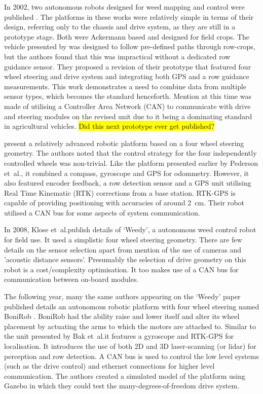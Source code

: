 \documentclass[preprint,authoryear,12pt]{elsarticle}
\begin{document}
    In 2002, two autonomous robots designed for weed mapping and control were published \citep{Pedersen2002,Astrand2002}.
    The platforms in these works were relatively simple in terms of their design, referring only to the chassis and drive system, as they are still in a prototype stage.
    Both were Ackermann based and designed for field crops.
    The vehicle presented by \cite{Pedersen2002} was designed to follow pre-defined paths through row-crops, but the authors found that this was impractical without a dedicated row guidance sensor.
    They proposed a revision of their prototype that featured four wheel steering and drive system and integrating both GPS and a row guidance measurements.
    This work demonstrates a need to combine data from multiple sensor types, which becomes the standard henceforth.
    Mention at this time was made of utilising a Controller Area Network (CAN) to communicate with drive and steering modules on the revised unit due to it being a dominating standard in agricultural vehicles.
    \colorbox{yellow}{Did this next prototype ever get published?}
    
    \cite{Bak2004} present a relatively advanced robotic platform based on a four wheel steering geometry.
    The authors noted that the control strategy for the four independently controlled wheels was non-trivial.
    Like the platform presented earlier by Pederson et~al.\@, it combined a compass, gyroscope and GPS for odommetry.
    However, it also featured encoder feedback, a row detection sensor and a GPS unit utilising Real Time Kinematic (RTK) corrections from a base station.
    RTK-GPS is capable of providing positioning with accuracies of around \SI{2}{\centi\meter}.
    Their robot utilised a CAN bus for some aspects of system communication.

    In 2008, Klose et~al.\@ publish details of `Weedy', a autonomous weed control robot for field use.
    It used a simplistic four wheel steering geometry.
    There are few details on the sensor selection apart from mention of the use of cameras and 'acoustic distance sensors'.
    Presumably the selection of drive geometry on this robot is a cost/complexity optimisation.
    It too makes use of a CAN bus for communication between on-board modules.

    The following year, many the same authors appearing on the `Weedy' paper published details an autonomous robotic platform with four wheel steering named BoniRob \citep{Ruckelshausen2009}.
    BoniRob had the ability raise and lower itself and alter its wheel placement by actuating the arms to which the motors are attached to.
    Similar to the unit presented by Bak et~al.\@ it features a gyroscope and RTK-GPS for localisation.
    It introduces the use of both 2D and 3D laser-scanning (or lidar) for perception and row detection.
    A CAN bus is used to control the low level systems (such as the drive control) and ethernet connections for higher level communication.
    The authors created a simulated model of the platform using Gazebo in which they could test the many-degrees-of-freedom drive system.
\end{document}
